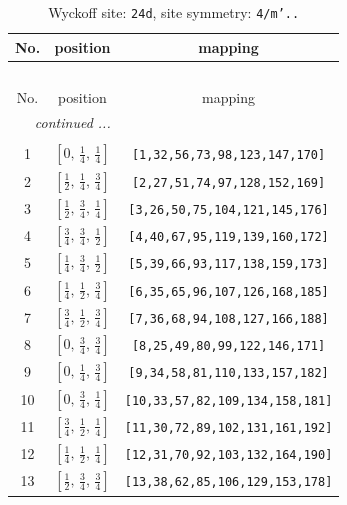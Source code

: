 \documentclass[fleqn,8pt]{jsarticle}
\begin{document}
\begin{longtable}{ccc}
\caption{Wyckoff site: {\tt 24d}, site symmetry: {\tt 4/m'..}}
 \\
 \hline \hline
No. & position & mapping \\ \hline \endfirsthead

\multicolumn{2}{l}{\tablename\ \thetable{}} \\
 \hline \hline
No. & position & mapping \\ \hline \endhead

 \hline \hline
\multicolumn{2}{r}{\footnotesize\it continued ...} \\ \endfoot

 \hline \hline
\multicolumn{2}{r}{} \\ \endlastfoot

1 & $\left[ 0,\, \frac{1}{4},\, \frac{1}{4} \right]$ & {\tt [1,32,56,73,98,123,147,170]} \\ \hline
2 & $\left[ \frac{1}{2},\, \frac{1}{4},\, \frac{3}{4} \right]$ & {\tt [2,27,51,74,97,128,152,169]} \\ \hline
3 & $\left[ \frac{1}{2},\, \frac{3}{4},\, \frac{1}{4} \right]$ & {\tt [3,26,50,75,104,121,145,176]} \\ \hline
4 & $\left[ \frac{3}{4},\, \frac{3}{4},\, \frac{1}{2} \right]$ & {\tt [4,40,67,95,119,139,160,172]} \\ \hline
5 & $\left[ \frac{1}{4},\, \frac{3}{4},\, \frac{1}{2} \right]$ & {\tt [5,39,66,93,117,138,159,173]} \\ \hline
6 & $\left[ \frac{1}{4},\, \frac{1}{2},\, \frac{3}{4} \right]$ & {\tt [6,35,65,96,107,126,168,185]} \\ \hline
7 & $\left[ \frac{3}{4},\, \frac{1}{2},\, \frac{3}{4} \right]$ & {\tt [7,36,68,94,108,127,166,188]} \\ \hline
8 & $\left[ 0,\, \frac{3}{4},\, \frac{3}{4} \right]$ & {\tt [8,25,49,80,99,122,146,171]} \\ \hline
9 & $\left[ 0,\, \frac{1}{4},\, \frac{3}{4} \right]$ & {\tt [9,34,58,81,110,133,157,182]} \\ \hline
10 & $\left[ 0,\, \frac{3}{4},\, \frac{1}{4} \right]$ & {\tt [10,33,57,82,109,134,158,181]} \\ \hline
11 & $\left[ \frac{3}{4},\, \frac{1}{2},\, \frac{1}{4} \right]$ & {\tt [11,30,72,89,102,131,161,192]} \\ \hline
12 & $\left[ \frac{1}{4},\, \frac{1}{2},\, \frac{1}{4} \right]$ & {\tt [12,31,70,92,103,132,164,190]} \\ \hline
13 & $\left[ \frac{1}{2},\, \frac{3}{4},\, \frac{3}{4} \right]$ & {\tt [13,38,62,85,106,129,153,178]} \\ \hline

\end{longtable}
\end{document}
